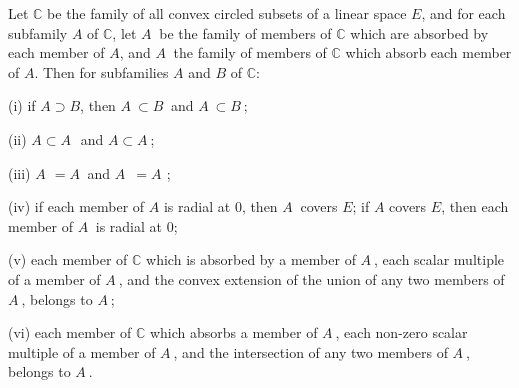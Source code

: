 Let $\mathbb{C}$ be the family of all convex circled subsets of a linear space $E$, and for each subfamily $A$ of $\mathbb{C}$, let $A_~$ be the family of members of $\mathbb{C}$ which are absorbed by each member of $A$, and $A^~$ the family of members of $\mathbb{C}$ which absorb each member of $A$. Then for subfamilies $A$ and $B$ of $\mathbb{C}$:

(i) if $A \supset B$, then $A_~ \subset B_~$ and $A^~ \subset B^~$;

(ii) $A \subset A^{~_~}$ and $A \subset A_~^~$;

(iii) $A^{~_~^~} = A_~$ and $A^{~_~^~^~} = A^{~_~}$;

(iv) if each member of $A$ is radial at $0$, then $A_~$ covers $E$; if $A$ covers $E$, then each member of $A^~$ is radial at $0$;

(v) each member of $\mathbb{C}$ which is absorbed by a member of $A_~$, each scalar multiple of a member of $A_~$, and the convex extension of the union of any two members of $A_~$, belongs to $A_~$;

(vi) each member of $\mathbb{C}$ which absorbs a member of $A^~$, each non-zero scalar multiple of a member of $A^~$, and the intersection of any two members of $A^~$, belongs to $A^~$.
